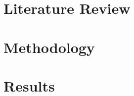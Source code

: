 \documentclass[11pt]{report}
\begin{document}


\newpage
\tableofcontents
\listoffigures
\listoftables
\lstlistoflistings
\newpage

% 
% 

\chapter{Literature Review}



\chapter{Methodology}

\chapter{Results}
\lipsum[1-3]








\clearpage
{}
\printindex
\end{document}
